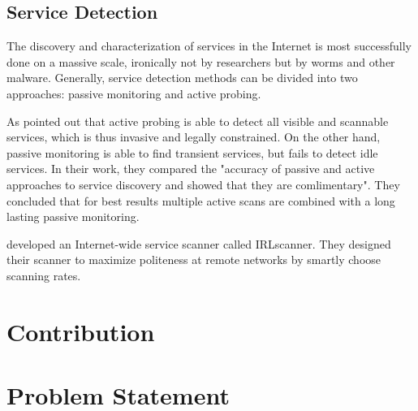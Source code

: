 \subsection{Service Detection} 

The discovery and characterization of services in the Internet is most
successfully done on a massive scale, ironically not by researchers but by worms
and other malware\citep{Chen:2007}. Generally, service detection methods can be
divided into two approaches: passive monitoring and active probing. 

As \citet{Bartlett07b} pointed out that active probing is able to detect all
visible and scannable services, which is thus invasive and legally constrained.
On the other hand, passive monitoring is able to find transient services, but
fails to detect idle services. In their work, they compared the "accuracy of
passive and active approaches to service discovery and showed that they are
comlimentary"\citep{Bartlett07b}. They concluded that for best results multiple
active scans are combined with a long lasting passive monitoring. 

\citet{Leonard:2010} developed an Internet-wide service scanner called
IRLscanner. They designed their scanner to maximize politeness at remote
networks by smartly choose scanning rates. 

\section{Contribution 
\label{sec:contribution}} 
\section{Problem Statement
\label{sec:problem}}
